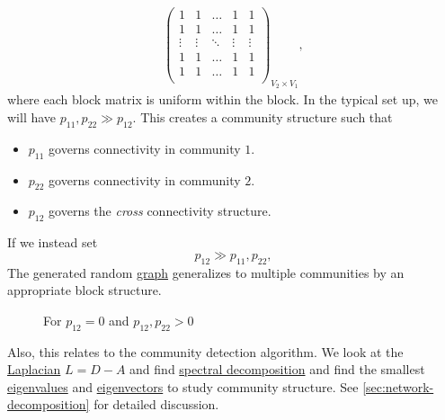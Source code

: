 \begin{eg}
\[\begin{split}
\begin{pmatrix}
				1      & 1      & \dots  & 1      & 1      \\
				1      & 1      & \dots  & 1      & 1      \\
				\vdots & \vdots & \ddots & \vdots & \vdots \\
				1      & 1      & \dots  & 1      & 1      \\
				1      & 1      & \dots  & 1      & 1      \\
			\end{pmatrix}_{V_2 \times V_1},
		\end{split}
	\]
	where each block matrix is uniform within the block. In the typical set up, we will have \(p_{11}, p_{22} \gg p_{12}\). This creates a community structure such that
	\begin{itemize}
		\item \(p_{11}\) governs connectivity in community \(1\).
		\item \(p_{22}\) governs connectivity in community \(2\).
		\item \(p_{12}\) governs the \emph{cross} connectivity structure.
	\end{itemize}

	\begin{remark}
		If we instead set
		\[
			p_{12}\gg p_{11}, p_{22},
		\]
		The generated random \hyperref[def:graph]{graph} generalizes to multiple communities by an appropriate block structure.

		\begin{figure}[H]
			\centering
			\caption{For \(p_{12}=0\) and \(p_{12}, p_{22}>0\)}
			\label{fig:bipartite-graph-generalization}
		\end{figure}

		Also, this relates to the community detection algorithm. We look at the \hyperref[def:Laplacian]{Laplacian} \(L = D - A\) and find \hyperref[thm:eigen-decomposition]{spectral decomposition} and find the smallest \hyperref[def:eigenvalue]{eigenvalues} and \hyperref[def:eigenvector]{eigenvectors} to study community structure. See \autoref{sec:network-decomposition} for detailed discussion.
	\end{remark}
\end{eg}

